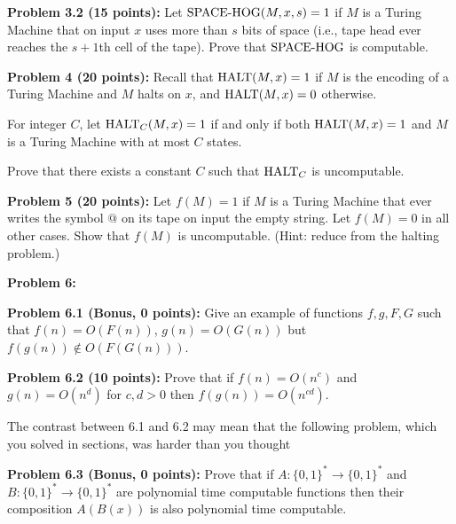 \documentclass[11pt]{article}
\begin{document}
\textbf{Problem 3.2 (15 points):} Let $\textrm{SPACE-HOG}(M,x,s) = 1$ if $M$ is a Turing Machine that on input $x$ uses more than $s$ bits of space (i.e., tape head ever reaches the $s+1$th cell of the tape). 
Prove that $\textrm{SPACE-HOG}$ is computable.

\textbf{Problem 4 (20 points):} Recall that $\mathrm{HALT}(M,x) = 1$ if $M$ is the encoding of a Turing Machine and $M$ halts on $x$, and $\mathrm{HALT}(M,x) = 0$ otherwise. 

 For integer $C$, let $\mathrm{HALT}_C(M,x) = 1$ if and only if both $\mathrm{HALT}(M,x) = 1$ and $M$ is a Turing Machine with at most $C$ states. 
 
 Prove that  there exists a constant $C$ such that $\mathrm{HALT}_C$ is uncomputable.


\textbf{Problem 5 (20 points):} Let $f(M) = 1$ if $M$ is a Turing Machine that ever writes the symbol $@$ on its tape on input the empty string. Let $f(M) = 0$ in all other cases. Show that $f(M)$ is uncomputable. (Hint: reduce from the halting problem.)

\textbf{Problem 6:}

\textbf{Problem 6.1 (Bonus, 0 points):} Give an example of functions $f,g,F,G$ such that $f(n) = O(F(n))$, $g(n) = O(G(n))$ but $f(g(n)) \not\in O(F(G(n)))$. 

\textbf{Problem 6.2 (10 points):}  Prove that if $f(n) = O(n^c)$ and $g(n) = O(n^d)$ for $c,d > 0$ then $f(g(n)) = O(n^{cd})$. 

The contrast between 6.1 and 6.2 may mean that the following problem, which you solved in sections, was harder than you thought

\textbf{Problem 6.3 (Bonus, 0 points):}  Prove that if $A:\{0,1\}^* \to \{0,1\}^*$ and $B:\{0,1\}^* \to \{0,1\}^*$ are polynomial time computable functions then their composition $A(B(x))$ is also polynomial time computable.
\end{document}
